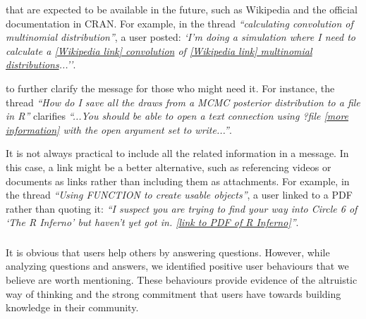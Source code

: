     \begin{description}[itemsep=3pt, topsep=2pt, leftmargin=1em, parsep=0pt]
        \item[Use well-maintained Websites] that are expected to be available in the future, such as Wikipedia and the official documentation in CRAN.
        For example, in the \SO thread \textit{``calculating convolution of multinomial distribution''}, a user posted: \textit{`I'm doing a simulation
          where I need to calculate a \href{https://en.wikipedia.org/wiki/Convolution_of_probability_distributions}{[Wikipedia link] convolution} of
          \href{https://en.wikipedia.org/wiki/Multinomial_distribution}{[Wikipedia link] multinomial distributions}...''}.

        \item[Use resources that support or expand the message] to further clarify the message for those who might need it.
        For instance, the \SO thread \textit{``How do I save all the draws from a MCMC posterior distribution to a file in R''} clarifies \textit{``...You should be able to open a text connection using ?file \href{http://stat.ethz.ch/R-manual/R-devel/library/base/html/connections.html}{[more information]} with the open argument set to write...''}.

        \item[What to do when material relevant to the message is too big.] It is not always practical to include all the related information in a message. In this
          case, a link might be a better alternative, such as referencing videos or documents as links rather than including them as attachments.
        For example, in the \RH thread \textit{``Using FUNCTION to create usable objects''}, a user linked to a PDF rather than quoting it: \textit{``I suspect you are trying to find your way
          into Circle 6 of `The R Inferno' but haven't yet got in. \href{http://www.burns-stat.com/pages/Tutor/R\_inferno.pdf}{[link to PDF of R Inferno]}''}.
    \end{description}

\subsubsection{\rece}
\label{sec:userbeh}

It is obvious that users help others by answering questions. However, while analyzing questions and answers, we identified positive user behaviours that
we believe are worth mentioning.  These behaviours provide evidence of the altruistic way of thinking and the strong commitment that users have towards building knowledge in their community.

